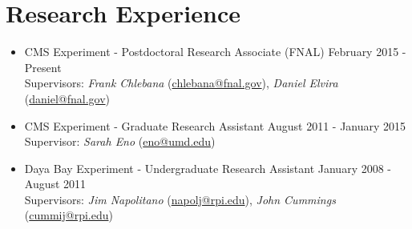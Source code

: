 \section{Research Experience}
\begin{itemize}[leftmargin=12pt]
\item CMS Experiment - Postdoctoral Research Associate (FNAL) \hfill February 2015 - Present\\
Supervisors: {\sl Frank Chlebana} (\href{mailto:chlebana@fnal.gov}{chlebana@fnal.gov}), {\sl Daniel Elvira} (\href{mailto:daniel@fnal.gov}{daniel@fnal.gov})
\item CMS Experiment - Graduate Research Assistant \hfill August 2011 - January 2015\\
Supervisor: {\sl Sarah Eno} (\href{mailto:eno@umd.edu}{eno@umd.edu})
\item Daya Bay Experiment - Undergraduate Research Assistant \hfill January 2008 - August 2011\\
Supervisors: {\sl Jim Napolitano} (\href{mailto:napolj@rpi.edu}{napolj@rpi.edu}), {\sl John Cummings} (\href{mailto:cummij@rpi.edu}{cummij@rpi.edu})
\end{itemize}

